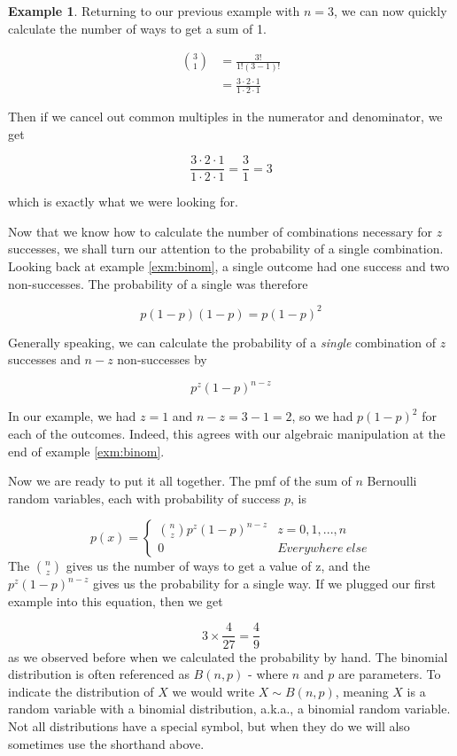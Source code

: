 \documentclass[
]{book}
\theoremstyle{definition}
\theoremstyle{definition}
\newtheorem{example}{Example}[chapter]
\theoremstyle{definition}
\theoremstyle{definition}
\theoremstyle{remark}
\begin{document}
\begin{example}
Returning to our previous example with \(n = 3\), we can now quickly calculate the number of ways to get a sum of 1.

\begin{align}
{3 \choose 1} &= \frac{3!}{1!(3-1)!} \\
&= \frac{3 \cdot 2 \cdot 1}{1 \cdot 2 \cdot 1}
\end{align}

Then if we cancel out common multiples in the numerator and denominator, we get

\[
\frac{3 \cdot 2 \cdot 1}{1 \cdot 2 \cdot 1} = \frac{3}{1} = 3
\]

which is exactly what we were looking for.
\end{example}

Now that we know how to calculate the number of combinations necessary for \(z\) successes, we shall turn our attention to the probability of a single combination. Looking back at example \ref{exm:binom}, a single outcome had one success and two non-successes. The probability of a single was therefore

\[
p(1-p)(1-p) = p(1-p)^2
\]

Generally speaking, we can calculate the probability of a \emph{single} combination of \(z\) successes and \(n-z\) non-successes by

\[
p^z(1-p)^{n-z}
\label{eq:singleprob}
\]

In our example, we had \(z = 1\) and \(n-z = 3-1 = 2\), so we had \(p(1-p)^2\) for each of the outcomes. Indeed, this agrees with our algebraic manipulation at the end of example \ref{exm:binom}.

Now we are ready to put it all together. The pmf of the sum of \(n\) Bernoulli random variables, each with probability of success \(p\), is

\[
p(x) = 
\begin{cases}
{n \choose z} p^z(1-p)^{n-z} & z = 0,1,...,n \\
0 & Everywhere\: else 
\end{cases}
\label{eq:binom}
\]
The \({n \choose z}\) gives us the number of ways to get a value of z, and the \(p^z(1-p)^{n-z}\) gives us the probability for a single way. If we plugged our first example into this equation, then we get

\[
3 \times \frac{4}{27} = \frac{4}{9}
\]
as we observed before when we calculated the probability by hand. The binomial distribution is often referenced as \(B(n,p)\) - where \(n\) and \(p\) are parameters. To indicate the distribution of \(X\) we would write \(X \sim B(n,p)\), meaning \(X\) is a random variable with a binomial distribution, a.k.a., a binomial random variable. Not all distributions have a special symbol, but when they do we will also sometimes use the shorthand above.
\end{document}
